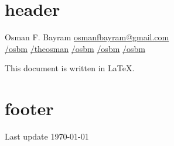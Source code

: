 \documentclass{resume-class} %
\author{Osman Faruk Bayram}
\begin{document}
\section{header}
\LARGE{Osman F. Bayram} \href{mailto://osmanfbayram@gmail.com}{osmanfbayram@gmail.com}\\

\href{http://github.com/osbm}{/osbm} \quad
{}\href{https://www.kaggle.com/theosman}{/theosman} \quad
{}\href{https://www.linkedin.com/in/osbm}{/osbm} \quad
{}\href{https://www.researchgate.net/profile/Osman-Faruk-Bayram}{/osbm} \quad
{}\href{https://orcid.org/0000-0002-4346-5356}{/osbm} \quad


\normalsize

This document is written in \LaTeX.

\section{footer}

Last update \today
\end{document}
